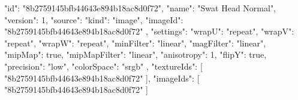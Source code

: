 {
  "id": "8b2759145bfb44643e894b18ac8d0f72",
  "name": "Swat Head Normal",
  "version": 1,
  "source": {
    "kind": "image",
    "imageId": "8b2759145bfb44643e894b18ac8d0f72"
  },
  "settings": {
    "wrapU": "repeat",
    "wrapV": "repeat",
    "wrapW": "repeat",
    "minFilter": "linear",
    "magFilter": "linear",
    "mipMap": true,
    "mipMapFilter": "linear",
    "anisotropy": 1,
    "flipY": true,
    "precision": "low",
    "colorSpace": "srgb"
  },
  "textureIds": [
    "8b2759145bfb44643e894b18ac8d0f72"
  ],
  "imageIds": [
    "8b2759145bfb44643e894b18ac8d0f72"
  ]
}
